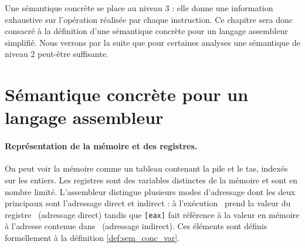 Une sémantique concrète se place au niveau 3 : elle donne une information exhaustive sur l'opération réalisée par chaque instruction.
Ce chapitre sera donc consacré à la définition d'une sémantique concrète pour un langage assembleur simplifié.
Nous verrons par la suite que pour certaines analyses une sémantique de niveau 2 peut-être suffisante.

\section{Sémantique concrète pour un langage assembleur}
\paragraph{Représentation de la mémoire et des registres.}
On peut voir la mémoire comme un tableau contenant la pile et le tas, indexés sur les entiers. Les registres sont des variables distinctes de la mémoire et sont en nombre limité.
L'assembleur distingue plusieurs modes d'adressage dont les deux principaux sont l'adressage direct et indirect : à l'exécution \eax\ prend la valeur du registre \eax\ (adressage direct) tandis que \texttt{[eax]} fait référence à la valeur en mémoire à l'adresse contenue dans \eax\ (adressage indirect).
Ces éléments sont définis formellement à la définition \ref{def:sem_conc_var}.




